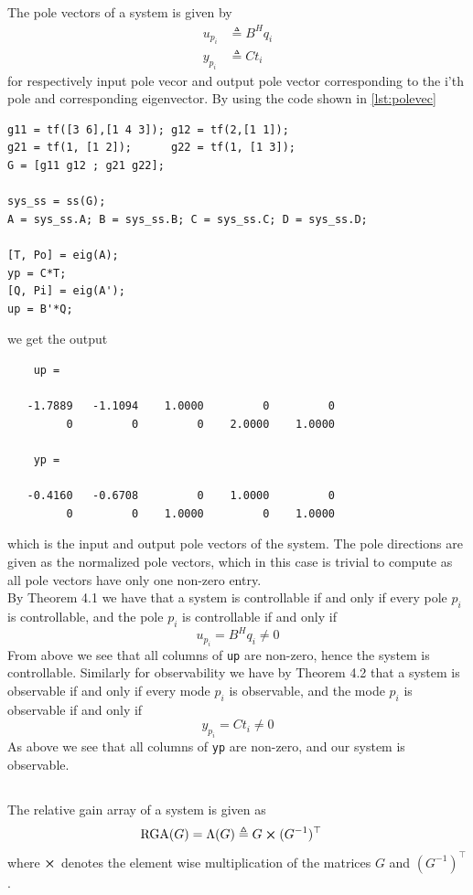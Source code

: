 \documentclass[a4paper]{scrartcl}
\begin{document}
\subsection{}
The pole vectors of a system is given by
\begin{equation}
	\begin{aligned}
		u_{p_i} &\triangleq B^H q_i\\
		y_{p_i} &\triangleq C t_i
	\end{aligned}
\end{equation}
for respectively input pole vecor and output pole vector corresponding to the i'th pole and corresponding eigenvector. By using the code shown in \autoref{lst:polevec}
\begin{lstlisting}[style=Matlab-editor, caption=Matlab code to generate pole vectors, label={lst:polevec}]
g11 = tf([3 6],[1 4 3]); g12 = tf(2,[1 1]);
g21 = tf(1, [1 2]);      g22 = tf(1, [1 3]);
G = [g11 g12 ; g21 g22];

sys_ss = ss(G);
A = sys_ss.A; B = sys_ss.B; C = sys_ss.C; D = sys_ss.D;

[T, Po] = eig(A);
yp = C*T;
[Q, Pi] = eig(A');
up = B'*Q;
\end{lstlisting}
we get the output
{\small \begin{verbatim}
	up =

   -1.7889   -1.1094    1.0000         0         0
         0         0         0    2.0000    1.0000

    yp =

   -0.4160   -0.6708         0    1.0000         0
         0         0    1.0000         0    1.0000
\end{verbatim}
}
which is the input and output pole vectors of the system. The pole directions are given as the normalized pole vectors, which in this case is trivial to compute as all pole vectors have only one non-zero entry. \\
By Theorem 4.1 we have that a system is controllable if and only if every pole $p_i$ is controllable, and the pole $p_i$ is controllable if and only if
\begin{equation}
	u_{p_i} = B^H q_i \neq 0
\end{equation}
From above we see that all columns of \texttt{up} are non-zero, hence the system is controllable. Similarly for observability we have by Theorem 4.2 that a system is observable if and only if every mode $p_i$ is observable, and the mode $p_i$ is observable if and only if 
\begin{equation}
	y_{p_i} = Ct_i \neq 0
\end{equation}
As above we see that all columns of \texttt{yp} are non-zero, and our system is observable.

\subsection{}
The relative gain array of a system is given as
\begin{equation}
	\begin{aligned}
		\text{RGA}(G) &= \Lambda(G) \triangleq G \cross (G^{-1})^\top
	\end{aligned}
\end{equation}
where $\cross$ denotes the element wise multiplication of the matrices $G$ and $(G^{-1})^\top$.
\end{document}
